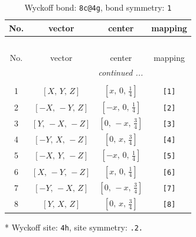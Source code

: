 \documentclass[fleqn,8pt]{jsarticle}
\begin{document}
\renewcommand{\arraystretch}{1.2}
\begin{longtable}{cccc}
\caption{Wyckoff bond: {\tt 8c@4g}, bond symmetry: {\tt 1}}
 \\
 \hline \hline
No. & vector & center & mapping \\ \hline \endfirsthead

\multicolumn{3}{l}{\tablename\ \thetable{}} \\
 \hline \hline
No. & vector & center & mapping \\ \hline \endhead

 \hline \hline
\multicolumn{3}{r}{\footnotesize\it continued ...} \\ \endfoot

 \hline \hline
\multicolumn{3}{r}{} \\ \endlastfoot

1 & $\left[ X,\, Y,\, Z \right]$ & $\left[ x,\, 0,\, \frac{1}{4} \right]$ & {\tt [1]} \\ \hline
2 & $\left[ - X,\, - Y,\, Z \right]$ & $\left[ - x,\, 0,\, \frac{1}{4} \right]$ & {\tt [2]} \\ \hline
3 & $\left[ Y,\, - X,\, - Z \right]$ & $\left[ 0,\, - x,\, \frac{3}{4} \right]$ & {\tt [3]} \\ \hline
4 & $\left[ - Y,\, X,\, - Z \right]$ & $\left[ 0,\, x,\, \frac{3}{4} \right]$ & {\tt [4]} \\ \hline
5 & $\left[ - X,\, Y,\, - Z \right]$ & $\left[ - x,\, 0,\, \frac{1}{4} \right]$ & {\tt [5]} \\ \hline
6 & $\left[ X,\, - Y,\, - Z \right]$ & $\left[ x,\, 0,\, \frac{1}{4} \right]$ & {\tt [6]} \\ \hline
7 & $\left[ - Y,\, - X,\, Z \right]$ & $\left[ 0,\, - x,\, \frac{3}{4} \right]$ & {\tt [7]} \\ \hline
8 & $\left[ Y,\, X,\, Z \right]$ & $\left[ 0,\, x,\, \frac{3}{4} \right]$ & {\tt [8]} \\
\end{longtable}
* Wyckoff site: {\tt 4h}, site symmetry: {\tt .2.}
\renewcommand{\arraystretch}{1.2}
\end{document}
